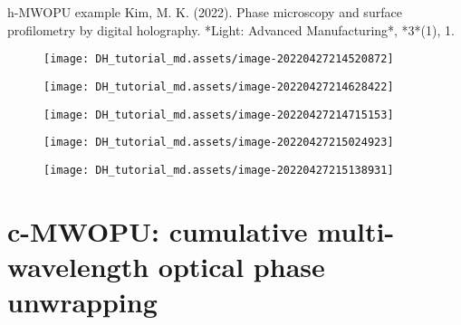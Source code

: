 \documentclass[t, aspectratio=169]{beamer}
\begin{document}


\begin{frame}[allowframebreaks]{h-MWOPU example}
Kim, M. K. (2022). Phase microscopy and surface profilometry by digital holography. *Light: Advanced Manufacturing*, *3*(1), 1.
	\begin{figure}
		\texttt{[image: DH\_tutorial\_md.assets/image-20220427214520872]}
	\end{figure}
	\begin{figure}
		\texttt{[image: DH\_tutorial\_md.assets/image-20220427214628422]}
	\end{figure}
	\begin{figure}
		\texttt{[image: DH\_tutorial\_md.assets/image-20220427214715153]}
	\end{figure}
	\begin{figure}
		\texttt{[image: DH\_tutorial\_md.assets/image-20220427215024923]}
	\end{figure}
	\begin{figure}
		\texttt{[image: DH\_tutorial\_md.assets/image-20220427215138931]}
	\end{figure}
\end{frame}


\section{c-MWOPU: cumulative multi-wavelength optical phase unwrapping}
\begin{frame}[c]
	\centering\LARGE\textbf{\secname}
\end{frame}
\end{document}
